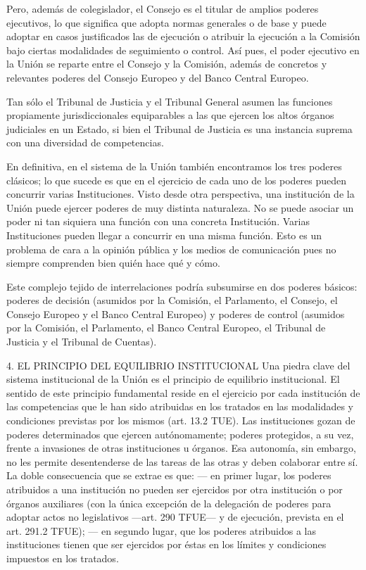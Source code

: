 \documentclass[10pt,a4paper]{article}
\begin{document}
Pero, además de colegislador, el Consejo es el titular de amplios poderes ejecutivos, lo que significa que adopta normas generales o de base y puede adoptar en casos justificados las de ejecución o atribuir la ejecución a la Comisión bajo ciertas modalidades de seguimiento o control. Así pues, el poder ejecutivo en la Unión se reparte entre el Consejo y la Comisión, además de concretos y relevantes poderes del Consejo Europeo y del Banco Central Europeo.

Tan sólo el Tribunal de Justicia y el Tribunal General asumen las funciones propiamente jurisdiccionales equiparables a las que ejercen los altos órganos judiciales en un Estado, si bien el Tribunal de Justicia es una instancia suprema con una diversidad de competencias.

En definitiva, en el sistema de la Unión también encontramos los tres poderes clásicos; lo que sucede es que en el ejercicio de cada uno de los poderes pueden concurrir varias Instituciones. Visto desde otra perspectiva, una institución de la Unión puede ejercer poderes de muy distinta naturaleza. No se puede asociar un poder ni tan siquiera una función con una concreta Institución. Varias Instituciones pueden llegar a concurrir en una misma función. Esto es un problema de cara a la opinión pública y los medios de comunicación pues no siempre comprenden bien quién hace qué y cómo.

Este complejo tejido de interrelaciones podría subsumirse en dos poderes básicos: poderes de decisión (asumidos por la Comisión, el Parlamento, el Consejo, el Consejo Europeo y el Banco Central Europeo) y poderes de control (asumidos por la Comisión, el Parlamento, el Banco Central Europeo, el Tribunal de Justicia y el  Tribunal de Cuentas).

4. EL PRINCIPIO DEL EQUILIBRIO
INSTITUCIONAL
Una piedra clave del sistema institucional de la Unión es el principio de equilibrio institucional. El sentido de este principio fundamental reside en el ejercicio por cada institución de las competencias que le han sido atribuidas en los tratados en las modalidades y condiciones previstas por los mismos (art. 13.2 TUE). Las instituciones gozan de poderes determinados que ejercen autónomamente; poderes protegidos, a su vez, frente a invasiones de otras instituciones u órganos. Esa autonomía, sin embargo, no les permite desentenderse de las tareas de las otras y deben colaborar entre sí. La doble consecuencia que se extrae es que: — en primer lugar, los poderes atribuidos a una institución no pueden ser ejercidos por otra institución o por órganos auxiliares (con la única excepción de la delegación de poderes para adoptar actos no legislativos —art. 290 TFUE— y de ejecución, prevista en el art. 291.2 TFUE); — en segundo lugar, que los poderes atribuidos a las instituciones tienen que ser ejercidos por éstas en los límites y condiciones impuestos en los tratados.
\end{document}
